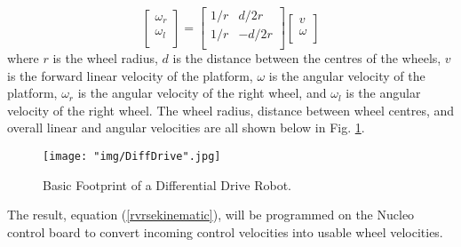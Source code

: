 \begin{equation}\label{rvrsekinematic}
    \left[ {\begin{array}{cc}
        \omega_r\\
        \omega_l\\
    \end{array} } \right] =
    \left[ {\begin{array}{cc}
        1/r & d/2r\\
        1/r & -d/2r\\
    \end{array} } \right]
    \left[ {\begin{array}{cc}
        v\\
        \omega\\
    \end{array} } \right]     
\end{equation}
where $r$ is the wheel radius, $d$ is the distance between the centres of the wheels, $v$ is the forward linear velocity of the platform, $\omega$ is the angular velocity of the platform, $\omega_r$ is the angular velocity of the right wheel, and $\omega_l$ is the angular velocity of the right wheel.
\newline
\newline
The wheel radius, distance between wheel centres, and overall linear and angular velocities are all shown below in Fig. \ref{fig:diffdrivefp}.

\begin{figure}[htbp]
    \centering
    \texttt{[image: "img/DiffDrive".jpg]} 
    \caption{Basic Footprint of a Differential Drive Robot.}
    \label{fig:diffdrivefp}
\end{figure}

The result, equation (\ref{rvrsekinematic}), will be programmed on the Nucleo control board to convert incoming control velocities into usable wheel velocities.
